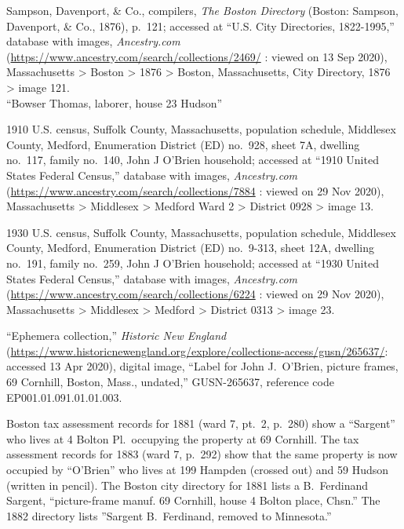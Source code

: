 \begin{thebibliography}{999}
Sampson, Davenport, \& Co., compilers, \textit{The Boston Directory} (Boston: Sampson, Davenport, \& Co., 1876), p.\ 121; accessed at ``U.S. City Directories, 1822-1995,'' database with images, \textit{Ancestry.com} (\url{https://www.ancestry.com/search/collections/2469/} : viewed on 13 Sep 2020), Massachusetts > Boston > 1876 > Boston, Massachusetts, City Directory, 1876 > image 121.\\
``Bowser Thomas, laborer, house 23 Hudson''

1910 U.S. census, Suffolk County, Massachusetts, population schedule, Middlesex County, Medford, Enumeration District (ED) no.\ 928, sheet 7A, dwelling no.\ 117, family no.\ 140, John J O'Brien household; accessed at ``1910 United States Federal Census,'' database with images, \textit{Ancestry.com} (\url{https://www.ancestry.com/search/collections/7884} : viewed on 29 Nov 2020), Massachusetts > Middlesex > Medford Ward 2 > District 0928 > image 13.

1930 U.S. census, Suffolk County, Massachusetts, population schedule, Middlesex County, Medford, Enumeration District (ED) no.\ 9-313, sheet 12A, dwelling no.\ 191, family no.\ 259, John J O'Brien household; accessed at ``1930 United States Federal Census,'' database with images, \textit{Ancestry.com} (\url{https://www.ancestry.com/search/collections/6224} : viewed on 29 Nov 2020), Massachusetts > Middlesex > Medford > District 0313 > image 23.

``Ephemera collection,'' \textit{Historic New England} (\url{https://www.historicnewengland.org/explore/collections-access/gusn/265637/}: accessed 13 Apr 2020), digital image, ``Label for John J.\ O'Brien, picture frames, 69 Cornhill, Boston, Mass., undated,'' GUSN-265637, reference code EP001.01.091.01.01.003.

Boston tax assessment records for 1881 (ward 7, pt.\ 2, p.\ 280) show a ``Sargent'' who lives at 4 Bolton Pl.\ occupying the property at 69 Cornhill. The tax assessment records for 1883 (ward 7, p.\ 292) show that the same property is now occupied by ``O'Brien'' who lives at 199 Hampden (crossed out) and 59 Hudson (written in pencil). The Boston city directory for 1881 lists a B.\ Ferdinand Sargent, ``picture-frame manuf. 69 Cornhill, house 4 Bolton place, Chsn.'' The 1882 directory lists ''Sargent B.\ Ferdinand, removed to Minnesota.'' 


\end{thebibliography}
